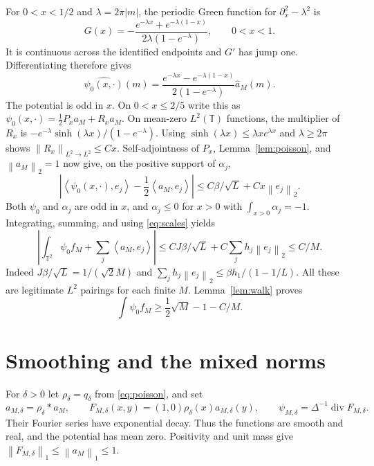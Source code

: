 \documentclass[11pt]{article}
\newcommand{\T}{\mathbb T}
\newcommand{\norm}[1]{\left\lVert#1\right\rVert}
\newcommand{\ip}[2]{\left\langle#1,#2\right\rangle}
\DeclareMathOperator{\diver}{div}
\begin{document}
For $0<x<1/2$ and $\lambda=2\pi|m|$, the periodic Green function for
$\partial_x^2-\lambda^2$ is
\[
 G(x)=-\frac{e^{-\lambda x}+e^{-\lambda(1-x)}}
                     {2\lambda(1-e^{-\lambda})},\qquad 0<x<1.
\]
It is continuous across the identified endpoints and $G'$ has jump one.
Differentiating therefore gives
\begin{equation}\label{eq:green}
 \widehat{\psi_0(x,\cdot)}(m)
       =\frac{e^{-\lambda x}-e^{-\lambda(1-x)}}
                   {2(1-e^{-\lambda})}\widehat a_M(m).
\end{equation}
The potential is odd in $x$. On $0<x\leq2/5$ write this as
$\psi_0(x,\cdot)=\tfrac12P_xa_M+R_xa_M$.
On mean-zero $L^2(\T)$ functions, the multiplier of $R_x$ is
$-e^{-\lambda}\sinh(\lambda x)/(1-e^{-\lambda})$.
Using $\sinh(\lambda x)\leq\lambda x e^{\lambda x}$ and
$\lambda\geq2\pi$ shows $\norm{R_x}_{L^2\to L^2}\leq Cx$.
Self-adjointness of $P_x$, Lemma~\ref{lem:poisson}, and $\norm{a_M}_2=1$
now give, on the positive support of $\alpha_j$,
\[
 \left|\ip{\psi_0(x,\cdot)}{e_j}-\frac12\ip{a_M}{e_j}\right|
       \leq C\beta/\sqrt L+Cx\norm{e_j}_2.
\]
Both $\psi_0$ and $\alpha_j$ are odd in $x$, and
$\alpha_j\leq0$ for $x>0$ with $\int_{x>0}\alpha_j=-1$.
Integrating, summing, and using \eqref{eq:scales} yields
\begin{equation}\label{eq:pairing}
 \left|\int_{\T^2}\psi_0f_M+\sum_j\ip{a_M}{e_j}\right|
 \leq CJ\beta/\sqrt L+C\sum_jh_j\norm{e_j}_2\leq C/M.
\end{equation}
Indeed $J\beta/\sqrt L=1/(\sqrt2M)$ and
$\sum_jh_j\norm{e_j}_2\leq\beta h_1/(1-1/L)$.
All these are legitimate $L^2$ pairings for each finite $M$.
Lemma~\ref{lem:walk} proves
\begin{equation}\label{eq:largepair}
 \int\psi_0f_M\geq\frac12\sqrt M-1-C/M.
\end{equation}

\section{Smoothing and the mixed norms}

For $\delta>0$ let $\rho_\delta=q_\delta$ from \eqref{eq:poisson}, and set
\[
 a_{M,\delta}=\rho_\delta*a_M,\qquad
 F_{M,\delta}(x,y)=(1,0)\rho_\delta(x)a_{M,\delta}(y),\qquad
 \psi_{M,\delta}=\Delta^{-1}\diver F_{M,\delta}.
\]
Their Fourier series have exponential decay. Thus the functions are smooth
and real, and the potential has mean zero. Positivity and unit mass give
$\norm{F_{M,\delta}}_1\leq\norm{a_M}_1\leq1$.
\end{document}
